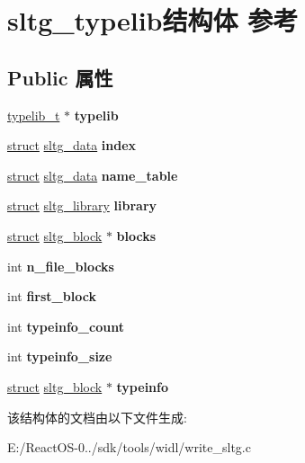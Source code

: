 \hypertarget{structsltg__typelib}{}\section{sltg\+\_\+typelib结构体 参考}
\label{structsltg__typelib}
\subsection*{Public 属性}
\begin{DoxyCompactItemize}
\item 
\mbox{\label{structsltg__typelib_a0dd3747f75926683e0c8bd1f5d4d708f}} 
\hyperlink{struct__typelib__t}{typelib\+\_\+t} $\ast$ {\bfseries typelib}
\item 
\mbox{\label{structsltg__typelib_a3029bf04c046f5e9cdc4c3ca501c6154}} 
\hyperlink{interfacestruct}{struct} \hyperlink{structsltg__data}{sltg\+\_\+data} {\bfseries index}
\item 
\mbox{\label{structsltg__typelib_ab63bcb6b7e9bce93d8274e390fccab2f}} 
\hyperlink{interfacestruct}{struct} \hyperlink{structsltg__data}{sltg\+\_\+data} {\bfseries name\+\_\+table}
\item 
\mbox{\label{structsltg__typelib_a5d7a585ec4074b6cf0d62f0dbedb5bcb}} 
\hyperlink{interfacestruct}{struct} \hyperlink{structsltg__library}{sltg\+\_\+library} {\bfseries library}
\item 
\mbox{\label{structsltg__typelib_a8f14ea7dad264029271244cac2c25f4d}} 
\hyperlink{interfacestruct}{struct} \hyperlink{structsltg__block}{sltg\+\_\+block} $\ast$ {\bfseries blocks}
\item 
\mbox{\label{structsltg__typelib_a58d605a2c8d128288e4dfeec79b6c35b}} 
int {\bfseries n\+\_\+file\+\_\+blocks}
\item 
\mbox{\label{structsltg__typelib_a94019af30d3d58fcb60ba843d7e4b385}} 
int {\bfseries first\+\_\+block}
\item 
\mbox{\label{structsltg__typelib_a7a0d43f4f75ad8e493e0c9a870e6380b}} 
int {\bfseries typeinfo\+\_\+count}
\item 
\mbox{\label{structsltg__typelib_a4619531da35958e3b02fd7add713853d}} 
int {\bfseries typeinfo\+\_\+size}
\item 
\mbox{\label{structsltg__typelib_a3740e6b6591ea6818e1048de2bab6b04}} 
\hyperlink{interfacestruct}{struct} \hyperlink{structsltg__block}{sltg\+\_\+block} $\ast$ {\bfseries typeinfo}
\end{DoxyCompactItemize}


该结构体的文档由以下文件生成\+:\begin{DoxyCompactItemize}
\item 
E\+:/\+React\+O\+S-\/0../sdk/tools/widl/write\+\_\+sltg.\+c\end{DoxyCompactItemize}

